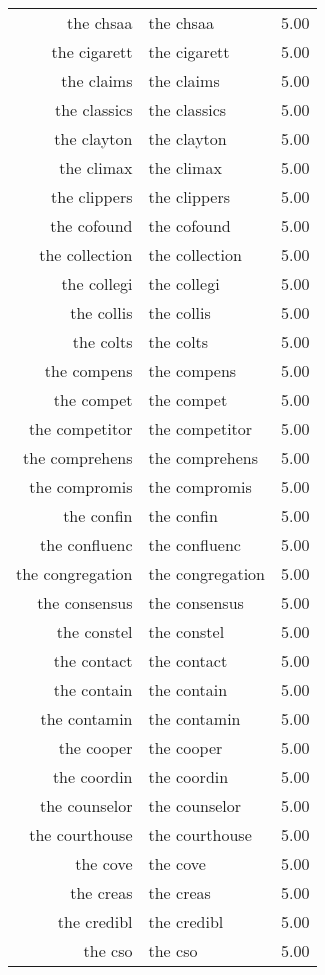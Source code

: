 \begin{table}[ht]
\begin{tabular}{rlr}
  the chsaa & the chsaa & 5.00 \\ 
  the cigarett & the cigarett & 5.00 \\ 
  the claims & the claims & 5.00 \\ 
  the classics & the classics & 5.00 \\ 
  the clayton & the clayton & 5.00 \\ 
  the climax & the climax & 5.00 \\ 
  the clippers & the clippers & 5.00 \\ 
  the cofound & the cofound & 5.00 \\ 
  the collection & the collection & 5.00 \\ 
  the collegi & the collegi & 5.00 \\ 
  the collis & the collis & 5.00 \\ 
  the colts & the colts & 5.00 \\ 
  the compens & the compens & 5.00 \\ 
  the compet & the compet & 5.00 \\ 
  the competitor & the competitor & 5.00 \\ 
  the comprehens & the comprehens & 5.00 \\ 
  the compromis & the compromis & 5.00 \\ 
  the confin & the confin & 5.00 \\ 
  the confluenc & the confluenc & 5.00 \\ 
  the congregation & the congregation & 5.00 \\ 
  the consensus & the consensus & 5.00 \\ 
  the constel & the constel & 5.00 \\ 
  the contact & the contact & 5.00 \\ 
  the contain & the contain & 5.00 \\ 
  the contamin & the contamin & 5.00 \\ 
  the cooper & the cooper & 5.00 \\ 
  the coordin & the coordin & 5.00 \\ 
  the counselor & the counselor & 5.00 \\ 
  the courthouse & the courthouse & 5.00 \\ 
  the cove & the cove & 5.00 \\ 
  the creas & the creas & 5.00 \\ 
  the credibl & the credibl & 5.00 \\ 
  the cso & the cso & 5.00 \\ 

\end{tabular}
\end{table}
